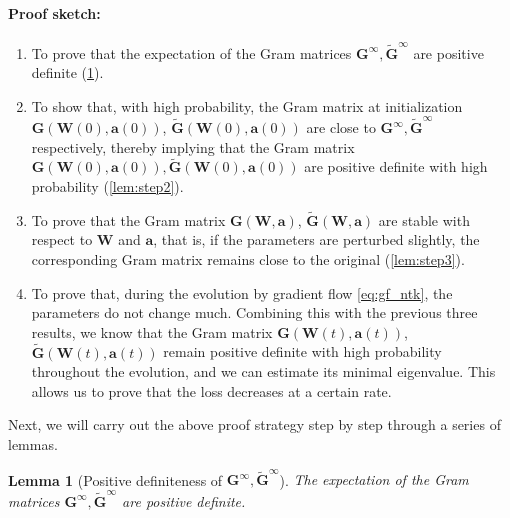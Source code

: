 \documentclass{article}
\newtheorem{lemma}{Lemma}
\begin{document}
\paragraph{Proof sketch:}
\begin{enumerate}
    \item[(i)] To prove that the expectation of the Gram matrices $\mathbf{G}^{\infty}, \mathbf{\widetilde{G}}^{\infty}$ are positive definite (\cref{lem:step1}).
    \item[(ii)] To show that, with high probability, the Gram matrix at initialization $\mathbf{G}(\mathbf{W}(0),\mathbf{a}(0))$, $\mathbf{\widetilde{G}}(\mathbf{W}(0),\mathbf{a}(0))$ are close to $\mathbf{G}^{\infty}, \mathbf{\widetilde{G}}^{\infty}$ respectively, thereby implying that the Gram matrix $\mathbf{G}(\mathbf{W}(0),\mathbf{a}(0)), \mathbf{\widetilde{G}}(\mathbf{W}(0),\mathbf{a}(0))$ are positive definite with high probability (\cref{lem:step2}).
    \item[(iii)] To prove that the Gram matrix $\mathbf{G}(\mathbf{W},\mathbf{a})$, $\widetilde{\mathbf{G}}(\mathbf{W},\mathbf{a})$ are stable with respect to $\mathbf{W}$ and $\mathbf{a}$, that is, if the parameters are perturbed slightly, the corresponding Gram matrix remains close to the original (\cref{lem:step3}). 
    \item[(iv)] To prove that, during the evolution by gradient flow \cref{eq:gf_ntk}, the parameters do not change much. Combining this with the previous three results, we know that the Gram matrix $\mathbf{G}(\mathbf{W}(t),\mathbf{a}(t))$, $\widetilde{\mathbf{G}}(\mathbf{W}(t),\mathbf{a}(t))$ remain positive definite with high probability throughout the evolution, and we can estimate its minimal eigenvalue. This allows us to prove that the loss decreases at a certain rate.
\end{enumerate}
Next, we will carry out the above proof strategy step by step through a series of lemmas.
\begin{lemma}[Positive definiteness of $\mathbf{G}^{\infty}, \mathbf{\widetilde{G}}^{\infty}$] \label{lem:step1}
    The expectation of the Gram matrices $\mathbf{G}^{\infty}, \mathbf{\widetilde{G}}^{\infty}$ are positive definite.
\end{lemma}
\end{document}
